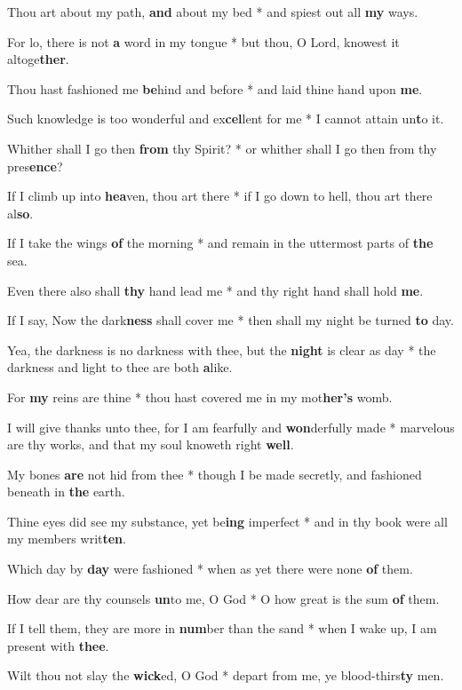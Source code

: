 \begin{multicols}{2}
	Thou art about my path, \textbf{and} about my bed * and spiest out all \textbf{my} ways.
	
	For lo, there is not \textbf{a} word in my tongue * but thou, O Lord, knowest it altoge\textbf{ther}.
	
	Thou hast fashioned me \textbf{be}hind and before * and laid thine hand upon \textbf{me}.
	
	Such knowledge is too wonderful and ex\textbf{cel}lent for me * I cannot attain un\textbf{t}o it.
	
	Whither shall I go then \textbf{from} thy Spirit? * or whither shall I go then from thy pres\textbf{ence}?
	
	If I climb up into \textbf{hea}ven, thou art there * if I go down to hell, thou art there al\textbf{so}.
	
	If I take the wings \textbf{of} the morning * and remain in the uttermost parts of \textbf{the} sea.
	
	Even there also shall \textbf{thy} hand lead me * and thy right hand shall hold \textbf{me}.
	
	If I say, Now the dark\textbf{ness} shall cover me * then shall my night be turned \textbf{to} day.
	
	Yea, the darkness is no darkness with thee, but the \textbf{night} is clear as day * the darkness and light to thee are both \textbf{a}like.
	
	For \textbf{my} reins are thine * thou hast covered me in my mot\textbf{her's} womb.
	
	I will give thanks unto thee, for I am fearfully and \textbf{won}derfully made * marvelous are thy works, and that my soul knoweth right \textbf{well}.
	
	My bones \textbf{are} not hid from thee * though I be made secretly, and fashioned beneath in \textbf{the} earth.
	
	Thine eyes did see my substance, yet be\textbf{ing} imperfect * and in thy book were all my members writ\textbf{ten}.
	
	Which day by \textbf{day} were fashioned * when as yet there were none \textbf{of} them.
	
	How dear are thy counsels \textbf{un}to me, O God * O how great is the sum \textbf{of} them.
	
	If I tell them, they are more in \textbf{num}ber than the sand * when I wake up, I am present with \textbf{thee}.
	
	Wilt thou not slay the \textbf{wick}ed, O God * depart from me, ye blood-thirs\textbf{ty} men.
	

\end{multicols}
